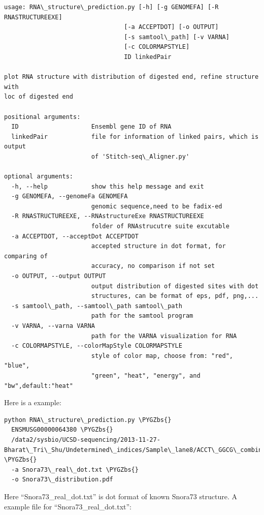 \documentclass[letterpaper,10pt,english]{sphinxmanual}
\def\PYGZbs{\char`\\}
\begin{document}
\begin{Verbatim}[commandchars=\\\{\}]
usage: RNA\_structure\_prediction.py [-h] [-g GENOMEFA] [-R RNASTRUCTUREEXE]
                                 [-a ACCEPTDOT] [-o OUTPUT]
                                 [-s samtool\_path] [-v VARNA]
                                 [-c COLORMAPSTYLE]
                                 ID linkedPair

plot RNA structure with distribution of digested end, refine structure with
loc of digested end

positional arguments:
  ID                    Ensembl gene ID of RNA
  linkedPair            file for information of linked pairs, which is output
                        of 'Stitch-seq\_Aligner.py'

optional arguments:
  -h, --help            show this help message and exit
  -g GENOMEFA, --genomeFa GENOMEFA
                        genomic sequence,need to be fadix-ed
  -R RNASTRUCTUREEXE, --RNAstructureExe RNASTRUCTUREEXE
                        folder of RNAstrucutre suite excutable
  -a ACCEPTDOT, --acceptDot ACCEPTDOT
                        accepted structure in dot format, for comparing of
                        accuracy, no comparison if not set
  -o OUTPUT, --output OUTPUT
                        output distribution of digested sites with dot
                        structures, can be format of eps, pdf, png,...
  -s samtool\_path, --samtool\_path samtool\_path
                        path for the samtool program
  -v VARNA, --varna VARNA
                        path for the VARNA visualization for RNA
  -c COLORMAPSTYLE, --colorMapStyle COLORMAPSTYLE
                        style of color map, choose from: "red", "blue",
                        "green", "heat", "energy", and "bw",default:"heat"
\end{Verbatim}

Here is a example:

\begin{Verbatim}[commandchars=\\\{\}]
python RNA\_structure\_prediction.py \PYGZbs{}
  ENSMUSG00000064380 \PYGZbs{}
  /data2/sysbio/UCSD-sequencing/2013-11-27-Bharat\_Tri\_Shu/Undetermined\_indices/Sample\_lane8/ACCT\_GGCG\_combine/ACCT\_GGCG\_fragment\_paired\_align\_selfLigation.txt \PYGZbs{}
  -a Snora73\_real\_dot.txt \PYGZbs{}
  -o Snora73\_distribution.pdf
\end{Verbatim}

Here ``Snora73\_real\_dot.txt'' is dot format of known Snora73 structure.
A example file for ``Snora73\_real\_dot.txt'':
\end{document}

